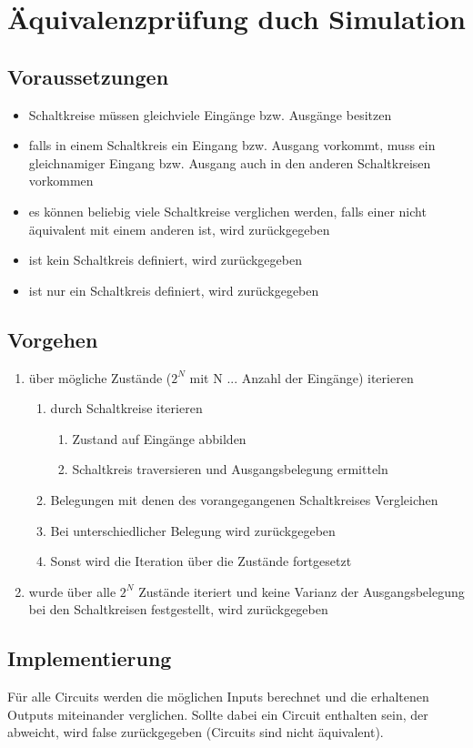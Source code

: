 \section{Äquivalenzprüfung duch Simulation}

\subsection{Voraussetzungen}
\begin{itemize}
	\item Schaltkreise müssen gleichviele Eingänge bzw. Ausgänge besitzen
	\item falls in einem Schaltkreis ein Eingang bzw. Ausgang vorkommt, muss ein gleichnamiger Eingang bzw. Ausgang auch in den anderen Schaltkreisen vorkommen
	\item es können beliebig viele Schaltkreise verglichen werden, falls einer nicht äquivalent mit einem anderen ist, wird  zurückgegeben
	\item ist kein Schaltkreis definiert, wird  zurückgegeben
	\item ist nur ein Schaltkreis definiert, wird  zurückgegeben

\end{itemize}

\subsection{Vorgehen}
\begin{enumerate}
	\item über mögliche Zustände ($2^N$ mit N ... Anzahl der Eingänge) iterieren

	\begin{enumerate}
		\item durch Schaltkreise iterieren
		\begin{enumerate}
			\item Zustand auf Eingänge abbilden
			\item Schaltkreis traversieren und Ausgangsbelegung ermitteln
		\end{enumerate}
		\item Belegungen mit denen des vorangegangenen Schaltkreises Vergleichen
		\item Bei unterschiedlicher Belegung wird  zurückgegeben
		\item Sonst wird die Iteration über die Zustände fortgesetzt
	\end{enumerate}
	
	\item wurde über alle $2^N$ Zustände iteriert und keine Varianz der Ausgangsbelegung bei den Schaltkreisen festgestellt, wird  zurückgegeben
\end{enumerate}


\subsection{Implementierung}
Für alle Circuits werden die möglichen Inputs berechnet und die erhaltenen Outputs miteinander verglichen. Sollte dabei ein Circuit enthalten sein, der abweicht, wird false zurückgegeben (Circuits sind nicht äquivalent). 
